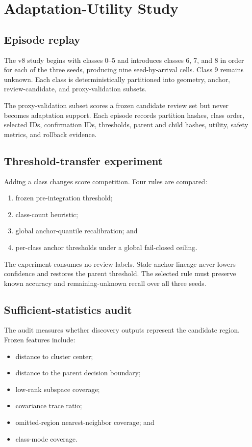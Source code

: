\documentclass[12pt,oneside]{report}
\begin{document}
\chapter{Adaptation-Utility Study}

\section{Episode replay}

The v8 study begins with classes 0--5 and introduces classes 6, 7, and 8 in
order for each of the three seeds, producing nine seed-by-arrival cells. Class
9 remains unknown. Each class is deterministically partitioned into geometry,
anchor, review-candidate, and proxy-validation subsets.

The proxy-validation subset scores a frozen candidate review set but never
becomes adaptation support. Each episode records partition hashes, class order,
selected IDs, confirmation IDs, thresholds, parent and child hashes, utility,
safety metrics, and rollback evidence.

\section{Threshold-transfer experiment}

Adding a class changes score competition. Four rules are compared:

\begin{enumerate}
\item frozen pre-integration threshold;
\item class-count heuristic;
\item global anchor-quantile recalibration; and
\item per-class anchor thresholds under a global fail-closed ceiling.
\end{enumerate}

The experiment consumes no review labels. Stale anchor lineage never lowers
confidence and restores the parent threshold. The selected rule must preserve
known accuracy and remaining-unknown recall over all three seeds.

\section{Sufficient-statistics audit}

The audit measures whether discovery outputs represent the candidate region.
Frozen features include:

\begin{itemize}
\item distance to cluster center;
\item distance to the parent decision boundary;
\item low-rank subspace coverage;
\item covariance trace ratio;
\item omitted-region nearest-neighbor coverage; and
\item class-mode coverage.
\end{itemize}
\end{document}
